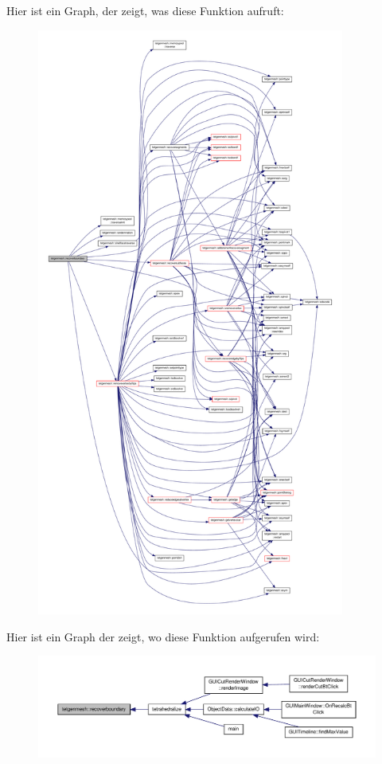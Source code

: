 Hier ist ein Graph, der zeigt, was diese Funktion aufruft\-:
\nopagebreak
\begin{figure}[H]
\begin{center}
\leavevmode
\includegraphics[height=550pt]{classtetgenmesh_a1be7dce56688fbe7a97fc31f98b61c19_cgraph}
\end{center}
\end{figure}




Hier ist ein Graph der zeigt, wo diese Funktion aufgerufen wird\-:
\nopagebreak
\begin{figure}[H]
\begin{center}
\leavevmode
\includegraphics[width=350pt]{classtetgenmesh_a1be7dce56688fbe7a97fc31f98b61c19_icgraph}
\end{center}
\end{figure}


